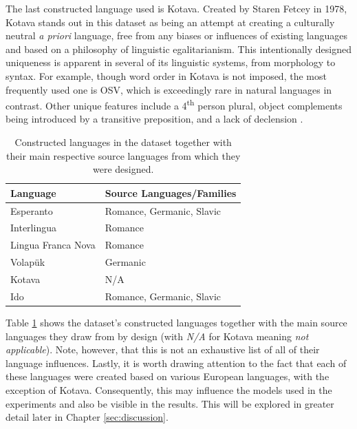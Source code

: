 \documentclass[12pt,a4paper]{article}
\numberwithin{figure}{section}
\numberwithin{table}{section}
\numberwithin{definition}{section}
\begin{document}

The last constructed language used is Kotava. Created by Staren Fetcey in 1978, Kotava stands out in this dataset as being an attempt at creating a culturally neutral \textit{a priori} language, free from any biases or influences of existing languages and based on a philosophy of linguistic egalitarianism. This intentionally designed uniqueness is apparent in several of its linguistic systems, from morphology to syntax. For example, though word order in Kotava is not imposed, the most frequently used one is OSV, which is exceedingly rare in natural languages in contrast. Other unique features include a 4\textsuperscript{th} person plural, object complements being introduced by a transitive preposition, and a lack of declension \parencite{Fetcey2013book}. 


\begin{table}[!h]
  \centering
  \renewcommand{\arraystretch}{1.5}
  \begin{tabular} {|p{5cm}|p{5cm}|}
  \hline
  \textbf{Language} & \textbf{Source Languages/Families} \\
  \hline
  Esperanto & Romance, Germanic, Slavic \\
  Interlingua & Romance \\
  Lingua Franca Nova & Romance \\
  Volapük & Germanic \\
  Kotava & N/A \\
  Ido & Romance, Germanic, Slavic \\
  \hline
  \end{tabular}
  \caption{Constructed languages in the dataset together with their main respective source languages from which they were designed.}
  \label{tbl:conlangs}
\end{table}

Table \ref{tbl:conlangs} shows the dataset's constructed languages together with the main source languages they draw from by design (with \textit{N/A} for Kotava meaning \textit{not applicable}). Note, however, that this is not an exhaustive list of all of their language influences. Lastly, it is worth drawing attention to the fact that each of these languages were created based on various European languages, with the exception of Kotava. Consequently, this may influence the models used in the experiments and also be visible in the results. This will be explored in greater detail later in Chapter \ref{sec:discussion}.
\end{document}
